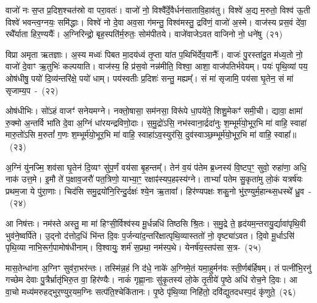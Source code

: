 {\anuvakamend[{त्रय॑स्त्रिꣳशच्च॒ व्यश्ञि॑य॒ एका॑\-दश च}]}%

वाजो॑ नः स॒प्त प्र॒दिश॒श्चत॑स्रो वा परा॒वतः॑। वाजो॑ नो॒ विश्वै᳚र्दे॒वैर्धन॑सातावि॒हाव॑तु। विश्वे॑ अ॒द्य म॒रुतो॒ विश्व॑ ऊ॒ती विश्वे॑ भवन्त्व॒ग्नयः॒ समि॑द्धाः। विश्वे॑ नो दे॒वा अव॒सा ग॑मन्तु॒ विश्व॑मस्तु॒ द्रवि॑णं॒ वाजो॑ अ॒स्मे। वाज॑स्य प्रस॒वं दे॑वा॒ रथै᳚र्याता हिर॒ण्ययैः᳚। अ॒ग्निरिन्द्रो॒ बृह॒स्पति॑र्म॒रुतः॒ सोम॑पीतये। वाजे॑वाजे\-ऽवत वाजिनो नो॒ धने॑षु~(२१)\ip

विप्रा अमृता ऋतज्ञाः। अ॒स्य मध्वः॑ पिबत मा॒दय॑ध्वं तृ॒प्ता या॑त प॒थिभि॑र्देव॒यानैः᳚। वाजः॑ पु॒रस्ता॑दु॒त म॑ध्य॒तो नो॒ वाजो॑ दे॒वाꣳ ऋ॒तुभिः॑ कल्पयाति। वाज॑स्य॒ हि प्र॑स॒वो नन्न॑मीति॒ विश्वा॒ आशा॒ वाज॑पतिर्भवेयम्। पयः॑ पृथि॒व्यां पय॒ ओष॑धीषु॒ पयो॑ दि॒व्य॑न्तरि॑क्षे॒ पयो॑ धाम्। पय॑स्वतीः प्र॒दिशः॑ सन्तु॒ मह्यम्᳚। सं मा॑ सृजामि॒ पय॑सा घृ॒तेन॒ सं मा॑ सृजाम्य॒प~-~(२२)\ip

ओष॑धीभिः। सो॑\-ऽहं वाजꣳ॑ सनेयमग्ने। नक्तो॒षासा॒ सम॑नसा॒ विरू॑पे धा॒पये॑ते॒ शिशु॒मेकꣳ॑ समी॒ची। द्यावा॒ क्षामा॑ रु॒क्मो अ॒न्तर्वि भा॑ति दे॒वा अ॒ग्निं धा॑रयन्द्रविणो॒दाः। स॒मु॒द्रो॑\-ऽसि॒ नभ॑स्वाना॒र्द्रदा॑नुः श॒म्भूर्म॑यो॒भूर॒भि मा॑ वाहि॒ स्वाहा॑ मारु॒तो॑\-ऽसि म॒रुतां᳚ ग॒णः श॒म्भूर्म॑यो॒भूर॒भि मा॑ वाहि॒ स्वाहा॑\-ऽ\-व॒स्युर॑सि॒ दुव॑स्वाञ्छ॒म्भूर्म॑यो॒भूर॒भि मा॑ वाहि॒ स्वाहा᳚॥~(२३)\ip

{\anuvakamend[{धने᳚ष्व॒पो दुव॑स्वाञ्छ॒म्भूर्म॑यो॒भूर॒भि मा॒ द्वे च॑}]}%

अ॒ग्निं यु॑नज्मि॒ शव॑सा घृ॒तेन॑ दि॒व्यꣳ सु॑प॒र्णं वय॑सा बृ॒हन्तम्᳚। तेन॑ व॒यं प॑तेम ब्र॒ध्नस्य॑ वि॒ष्टप॒ꣳ॒ सुवो॒ रुहा॑णा॒ अधि॒ नाक॑ उत्त॒मे। इ॒मौ ते॑ प॒क्षाव॒जरौ॑ पत॒त्रिणो॒ याभ्या॒ꣳ॒ रक्षाꣴ॑स्यप॒हꣴस्य॑ग्ने। ता\-भ्यां᳚ पतेम सु॒कृता॑मु लो॒कं यत्रर्\mbox{}ष॑यः प्रथम॒जा ये पु॑रा॒णाः। चिद॑सि समु॒द्रयो॑नि॒रिन्दु॒र्दक्षः॑ श्ये॒न ऋ॒तावा᳚। हिर॑ण्यपक्षः शकु॒नो भु॑र॒ण्युर्म॒हान्थ्स॒धस्थे᳚ ध्रु॒व~-~(२४)\ip

आ निष॑त्तः। नम॑स्ते अस्तु॒ मा मा॑ हिꣳसी॒र्विश्व॑स्य मू॒र्धन्नधि॑ तिष्ठसि श्रि॒तः। स॒मु॒द्रे ते॒ हृद॑यम॒न्तरायु॒र्द्यावा॑\-पृथि॒वी भुव॑ने॒ष्वर्पि॑ते। उ॒द्नो द॑त्तोद॒धिं भि॑न्त दि॒वः प॒र्जन्या॑\-द॒न्त\-रि॑क्षात्पृथि॒व्यास्ततो॑ नो॒ वृष्ट्या॑\-ऽ\-वत। दि॒वो मू॒र्धा\-ऽ\-सि॑ पृथि॒व्या नाभि॒रूर्ग॒पामोष॑धीनाम्। वि॒श्वायुः॒ शर्म॑ स॒प्रथा॒ नम॑स्प॒थे। येनर्\mbox{}ष॑य॒स्तप॑सा स॒त्र-~(२५)\ip

मास॒तेन्धा॑ना अ॒ग्निꣳ सुव॑रा॒भर॑न्तः। तस्मि॑न्न॒हं नि द॑धे॒ नाके॑ अ॒ग्निमे॒तं यमा॒हुर्मन॑वः स्ती॒र्णब॑र्\mbox{}हिषम्। तं पत्नी॑भि॒रनु॑ गच्छेम देवाः पु॒त्रैर्भ्रातृ॑भिरु॒त वा॒ हिर॑ण्यैः। नाकं॑ गृह्णा॒नाः सु॑कृ॒तस्य॑ लो॒के तृ॒तीये॑ पृ॒ष्ठे अधि॑ रोच॒ने दि॒वः। आ वा॒चो मध्य॑मरुहद्भुर॒ण्युर॒यम॒ग्निः सत्प॑ति॒श्चेकि॑तानः। पृ॒ष्ठे पृ॑थि॒व्या निहि॑तो॒ दवि॑द्युतदधस्प॒दं कृ॑णुते॒~(२६)\ip

